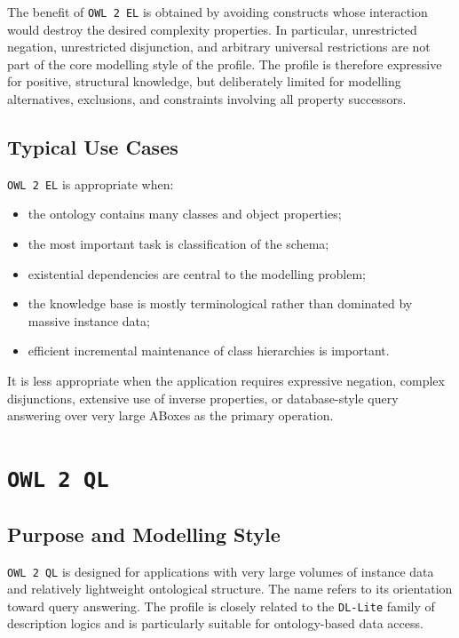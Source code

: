 \documentclass{scrbook}
\begin{document}
	The benefit of \texttt{OWL 2 EL} is obtained by avoiding constructs whose interaction would destroy the desired complexity properties. In particular, unrestricted negation, unrestricted disjunction, and arbitrary universal restrictions are not part of the core modelling style of the profile. The profile is therefore expressive for positive, structural knowledge, but deliberately limited for modelling alternatives, exclusions, and constraints involving all property successors.
	
	\subsection{Typical Use Cases}
	
	\texttt{OWL 2 EL} is appropriate when:
	\begin{itemize}
		\item the ontology contains many classes and object properties;
		\item the most important task is classification of the schema;
		\item existential dependencies are central to the modelling problem;
		\item the knowledge base is mostly terminological rather than dominated by massive instance data;
		\item efficient incremental maintenance of class hierarchies is important.
	\end{itemize}
	
	It is less appropriate when the application requires expressive negation, complex disjunctions, extensive use of inverse properties, or database-style query answering over very large ABoxes as the primary operation.
	
	\section{\texttt{OWL 2 QL}}
	
	\subsection{Purpose and Modelling Style}
	
	\texttt{OWL 2 QL} is designed for applications with very large volumes of instance data and relatively lightweight ontological structure. The name refers to its orientation toward query answering. The profile is closely related to the \texttt{DL-Lite} family of description logics and is particularly suitable for ontology-based data access.\\
	
\end{document}
